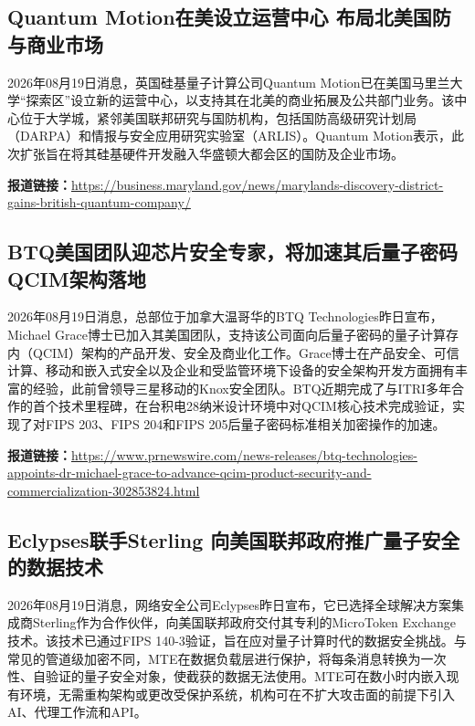 \documentclass[12pt,a4paper]{ctexart}
\begin{document}
\subsection{ Quantum Motion在美设立运营中心 布局北美国防与商业市场 }

2026年08月19日消息，英国硅基量子计算公司Quantum Motion已在美国马里兰大学“探索区”设立新的运营中心，以支持其在北美的商业拓展及公共部门业务。该中心位于大学城，紧邻美国联邦研究与国防机构，包括国防高级研究计划局（DARPA）和情报与安全应用研究实验室（ARLIS）。Quantum Motion表示，此次扩张旨在将其硅基硬件开发融入华盛顿大都会区的国防及企业市场。

\noindent\textbf{报道链接：}\url{https://business.maryland.gov/news/marylands-discovery-district-gains-british-quantum-company/}

\subsection{ BTQ美国团队迎芯片安全专家，将加速其后量子密码QCIM架构落地 }

2026年08月19日消息，总部位于加拿大温哥华的BTQ Technologies昨日宣布，Michael Grace博士已加入其美国团队，支持该公司面向后量子密码的量子计算存内（QCIM）架构的产品开发、安全及商业化工作。Grace博士在产品安全、可信计算、移动和嵌入式安全以及企业和受监管环境下设备的安全架构开发方面拥有丰富的经验，此前曾领导三星移动的Knox安全团队。BTQ近期完成了与ITRI多年合作的首个技术里程碑，在台积电28纳米设计环境中对QCIM核心技术完成验证，实现了对FIPS 203、FIPS 204和FIPS 205后量子密码标准相关加密操作的加速。

\noindent\textbf{报道链接：}\url{https://www.prnewswire.com/news-releases/btq-technologies-appoints-dr-michael-grace-to-advance-qcim-product-security-and-commercialization-302853824.html}

\subsection{ Eclypses联手Sterling 向美国联邦政府推广量子安全的数据技术 }

2026年08月19日消息，网络安全公司Eclypses昨日宣布，它已选择全球解决方案集成商Sterling作为合作伙伴，向美国联邦政府交付其专利的MicroToken Exchange技术。该技术已通过FIPS 140-3验证，旨在应对量子计算时代的数据安全挑战。与常见的管道级加密不同，MTE在数据负载层进行保护，将每条消息转换为一次性、自验证的量子安全对象，使截获的数据无法使用。MTE可在数小时内嵌入现有环境，无需重构架构或更改受保护系统，机构可在不扩大攻击面的前提下引入AI、代理工作流和API。
\end{document}

